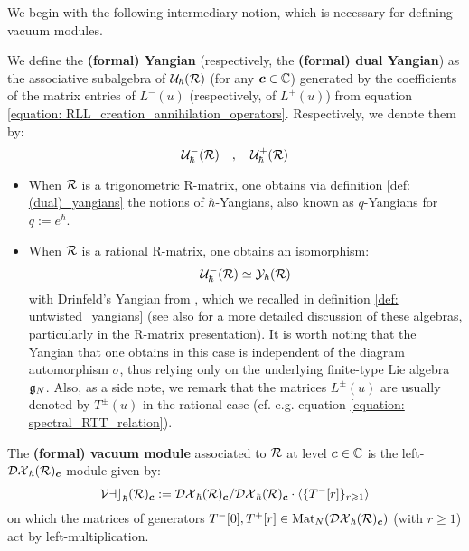         We begin with the following intermediary notion, which is necessary for defining vacuum modules.
        \begin{definition} \label{def: (dual)_yangians}
            We define the \textbf{(formal) Yangian} (respectively, the \textbf{(formal) dual Yangian}) as the associative subalgebra of $\mathcal{U}_{\hbar}(\mathcal{R})$ (for any $\boldsymbol{c} \in \mathbb{C}$) generated by the coefficients of the matrix entries of $L^-(u)$ (respectively, of $L^+(u)$) from equation \eqref{equation: RLL_creation_annihilation_operators}. Respectively, we denote them by:
                $$\mathcal{U}^-_{\hbar}(\mathcal{R}) \quad, \quad \mathcal{U}^+_{\hbar}(\mathcal{R})$$
        \end{definition}
        \begin{example} \label{example: trigonometric_and_rational_(dual)_yangians}
            \begin{itemize}
                \item When $\mathcal{R}$ is a trigonometric R-matrix, one obtains via definition \ref{def: (dual)_yangians} the notions of $\hbar$-Yangians, also known as $q$-Yangians for $q := e^{\hbar}$.  
                \item When $\mathcal{R}$ is a rational R-matrix, one obtains an isomorphism:
                    $$\mathcal{U}^-_{\hbar}(\mathcal{R}) \simeq \mathcal{Y}_{\hbar}(\mathcal{R})$$
                with Drinfeld's Yangian from \cite{drinfeld_original_yangian_paper}, which we recalled in definition \ref{def: untwisted_yangians} (see also \cite[Chapter 1]{molev_yangians_and_classical_lie_algebras} for a more detailed discussion of these algebras, particularly in the R-matrix presentation). It is worth noting that the Yangian that one obtains in this case is independent of the diagram automorphism $\sigma$, thus relying only on the underlying finite-type Lie algebra $\mathfrak{g}_N$. Also, as a side note, we remark that the matrices $L^{\pm}(u)$ are usually denoted by $T^{\pm}(u)$ in the rational case (cf. e.g. equation \eqref{equation: spectral_RTT_relation}).
            \end{itemize}
        \end{example}
        \begin{definition} \label{def: vacuum_modules}
            The \textbf{(formal) vacuum module} associated to $\mathcal{R}$ at level $\boldsymbol{c} \in \mathbb{C}$ is the left-$\mathcal{DX}_{\hbar}(\mathcal{R})_{\boldsymbol{c}}$-module given by:
                $$\mathcal{Vac}_{\hbar}(\mathcal{R})_{\boldsymbol{c}} := \mathcal{DX}_{\hbar}(\mathcal{R})_{\boldsymbol{c}}/\mathcal{DX}_{\hbar}(\mathcal{R})_{\boldsymbol{c}} \cdot \langle \{ T^-[r] \}_{r \geqslant 1} \rangle$$
            on which the matrices of generators $T^-[0], T^+[r] \in \operatorname{Mat}_N( \mathcal{DX}_{\hbar}(\mathcal{R})_{\boldsymbol{c}} )$ (with $r \geq 1$) act by left-multiplication.
        \end{definition}

